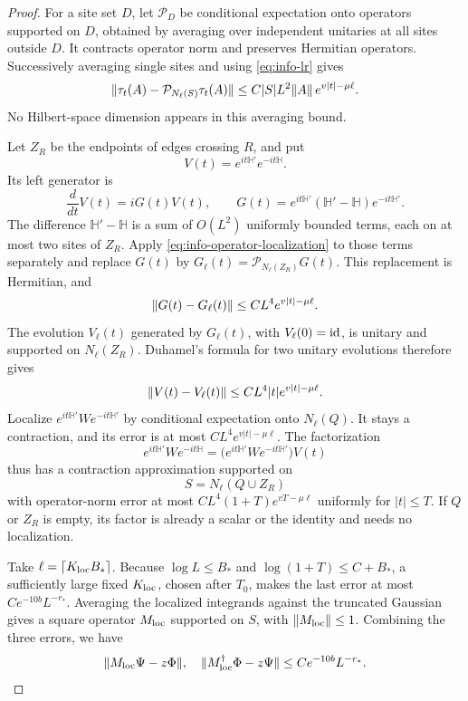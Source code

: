 \begin{proof}
For a site set $D$, let $\mathcal P_D$ be conditional expectation
onto operators supported on $D$, obtained by averaging over independent
unitaries at all sites outside $D$.  It contracts operator norm and
preserves Hermitian operators.  Successively averaging single sites
and using \eqref{eq:info-lr} gives
\begin{equation}
 \lVert \tau_t(A)-\mathcal P_{N_\ell(S)}\tau_t(A)\rVert
       \le C|S|L^2\lVert A\rVert\,e^{v|t|-\mu\ell}.
 \label{eq:info-operator-localization}
\end{equation}
No Hilbert-space dimension appears in this averaging bound.

Let $Z_R$ be the endpoints of edges crossing $R$, and put
\[
 V(t)=e^{it\mathbb H'}e^{-it\mathbb H}.
\]
Its left generator is
\[
 \frac{d}{dt}V(t)=iG(t)V(t),\qquad
 G(t)=e^{it\mathbb H'}(\mathbb H'-\mathbb H)e^{-it\mathbb H'}.
\]
The difference $\mathbb H'-\mathbb H$ is a sum of $O(L^2)$ uniformly
bounded terms, each on at most two sites of $Z_R$.  Apply
\eqref{eq:info-operator-localization} to those terms separately and
replace $G(t)$ by
$G_\ell(t)=\mathcal P_{N_\ell(Z_R)}G(t)$.  This replacement is
Hermitian, and
\[
 \lVert G(t)-G_\ell(t)\rVert\le CL^4e^{v|t|-\mu\ell}.
\]
The evolution $V_\ell(t)$ generated by $G_\ell(t)$, with
$V_\ell(0)=\operatorname{id}$, is unitary and supported on $N_\ell(Z_R)$.  Duhamel's formula for two unitary
evolutions therefore gives
\[
 \lVert V(t)-V_\ell(t)\rVert\le CL^4|t|e^{v|t|-\mu\ell}.
\]
Localize $e^{it\mathbb H'}We^{-it\mathbb H'}$ by conditional
expectation onto $N_\ell(Q)$.  It stays a contraction, and its error
is at most $CL^4e^{v|t|-\mu\ell}$.  The factorization
\[
 e^{it\mathbb H'}We^{-it\mathbb H}
   =\bigl(e^{it\mathbb H'}We^{-it\mathbb H'}\bigr)V(t)
\]
thus has a contraction approximation supported on
\[
 S=N_\ell(Q\cup Z_R)
\]
with operator-norm error at most
$CL^4(1+T)e^{vT-\mu\ell}$ uniformly for $|t|\le T$.
If $Q$ or $Z_R$ is empty, its factor is already a scalar or the
identity and needs no localization.

Take $\ell=\lceil K_{\rm loc}B_*\rceil$.  Because
$\log L\le B_*$ and $\log(1+T)\le C+B_*$, a sufficiently large fixed
$K_{\rm loc}$, chosen after $T_0$, makes the last error at most
$Ce^{-10b}L^{-r_*}$.  Averaging the localized integrands against the
truncated Gaussian gives a square operator $M_{\rm loc}$ supported on
$S$, with $\lVert M_{\rm loc}\rVert\le1$.  Combining the three errors, we
have
\begin{equation}
 \lVert M_{\rm loc}\Psi-z\Phi\rVert,\quad
 \lVert M_{\rm loc}^\dagger\Phi-z\Psi\rVert
      \le C e^{-10b}L^{-r_*}.
 \label{eq:info-local-two-sided}
\end{equation}


\end{proof}
